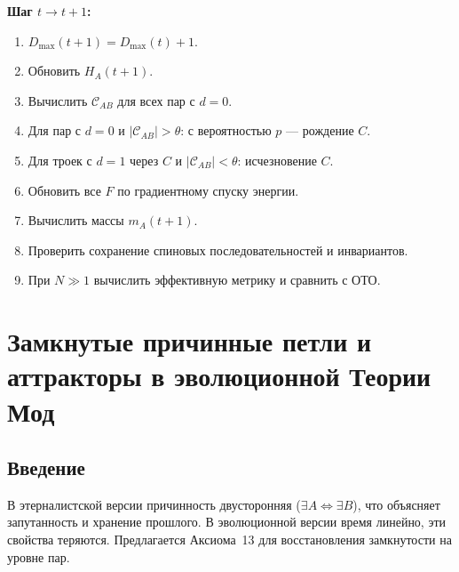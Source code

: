 \documentclass[12pt,a4paper]{article}
\begin{document}
\textbf{Шаг $t \to t+1$:}
\begin{enumerate}
    \item $D_{\max}(t+1) = D_{\max}(t) + 1$.
    \item Обновить $H_A(t+1)$.
    \item Вычислить $\mathcal{C}_{AB}$ для всех пар с $d=0$.
    \item Для пар с $d=0$ и $|\mathcal{C}_{AB}| > \theta$: с вероятностью $p$ --- рождение $C$.
    \item Для троек с $d=1$ через $C$ и $|\mathcal{C}_{AB}| < \theta$: исчезновение $C$.
    \item Обновить все $F$ по градиентному спуску энергии.
    \item Вычислить массы $m_A(t+1)$.
    \item Проверить сохранение спиновых последовательностей и инвариантов.
    \item При $N \gg 1$ вычислить эффективную метрику и сравнить с ОТО.
\end{enumerate}

\newpage
\section{Замкнутые причинные петли и аттракторы в эволюционной Теории Мод}

\begin{abstract}
Эволюционная версия Теории Мод с линейным временем теряет свойство замкнутости причинных петель, присущее этерналистской формулировке. Предложено расширение: дополнительная аксиома о замкнутых причинных петлях, совместимая с эволюцией сети и концепцией аттрактора. Аксиома гарантирует, что каждая причинно-связанная пара событий образует замкнутый спектральный контур, не требуя глобальной статичности сети. Обсуждается, как это расширение сохраняет объяснение квантовой запутанности и возможность чтения прошлого.

\bigskip
\noindent\textbf{Ключевые слова:} Теория Мод, замкнутые причинные петли, аттрактор, эволюция, квантовая запутанность.
\end{abstract}

\subsection{Введение}
В этерналистской версии причинность двусторонняя ($\exists A \iff \exists B$), что объясняет запутанность и хранение прошлого. В эволюционной версии время линейно, эти свойства теряются. Предлагается Аксиома~13 для восстановления замкнутости на уровне пар.
\end{document}

